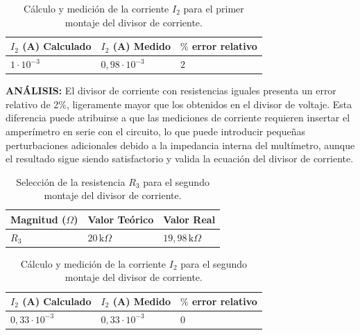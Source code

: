 \documentclass[12pt,a4paper]{article}
\begin{document}
\begin{table}[!ht]
    \centering
    \fontsize{10pt}{12pt}\selectfont
    \renewcommand{\arraystretch}{1.2}
    \setlength{\tabcolsep}{6pt}
    {
    \begin{tabular}{|C{4cm}|C{4cm}|C{4cm}|}
    \hline
    \textbf{$I_2$ (A) Calculado} & \textbf{$I_2$ (A) Medido} & \textbf{$\%$ error relativo} \\
    \hline
    $1\cdot10^{-3}$ & $0{,}98\cdot10^{-3}$ & $2$ \\
    \hline
    \end{tabular}}
\caption{Cálculo y medición de la corriente $I_2$ para el primer montaje del divisor de corriente.}
\label{tab:divisor-corriente-ir2-1}
\end{table}

\textbf{ANÁLISIS:} El divisor de corriente con resistencias iguales presenta un error relativo de 2\%, ligeramente mayor que los obtenidos en el divisor de voltaje. Esta diferencia puede atribuirse a que las mediciones de corriente requieren insertar el amperímetro en serie con el circuito, lo que puede introducir pequeñas perturbaciones adicionales debido a la impedancia interna del multímetro, aunque el resultado sigue siendo satisfactorio y valida la ecuación del divisor de corriente.

\begin{table}[H]
    \centering
    \fontsize{10pt}{12pt}\selectfont
    \renewcommand{\arraystretch}{1.2}
    \setlength{\tabcolsep}{6pt}
    {
    \begin{tabular}{|C{3cm}|C{3cm}|C{3cm}|}
    \hline
    \textbf{Magnitud ($\Omega$)} & \textbf{Valor Teórico} & \textbf{Valor Real} \\
    \hline
    $R_3$ & $20\,\mathrm{k}\Omega$ & $19{,}98\,\mathrm{k}\Omega$ \\
    \hline
    \end{tabular}}
\caption{Selección de la resistencia $R_3$ para el segundo montaje del divisor de corriente.}
\label{tab:divisor-corriente-r3}
\end{table}

\begin{table}[H]
    \centering
    \fontsize{10pt}{12pt}\selectfont
    \renewcommand{\arraystretch}{1.2}
    \setlength{\tabcolsep}{6pt}
    {
    \begin{tabular}{|C{4cm}|C{4cm}|C{4cm}|}
    \hline
    \textbf{$I_2$ (A) Calculado} & \textbf{$I_2$ (A) Medido} & \textbf{$\%$ error relativo} \\
    \hline
    $0{,}33\cdot10^{-3}$ & $0{,}33\cdot10^{-3}$ & $0$ \\
    \hline
    \end{tabular}}
\caption{Cálculo y medición de la corriente $I_2$ para el segundo montaje del divisor de corriente.}
\label{tab:divisor-corriente-ir2-2}
\end{table}
\end{document}
